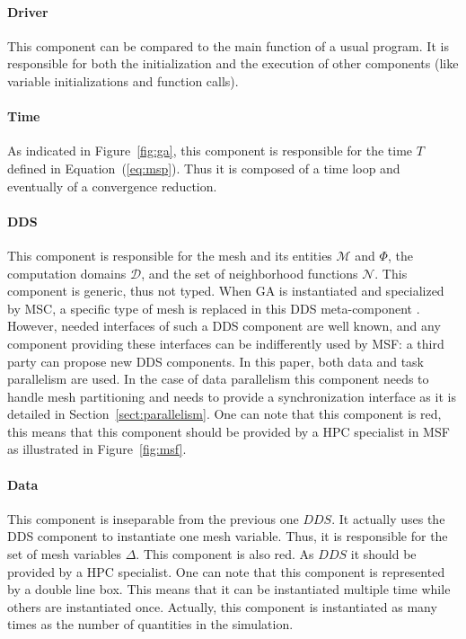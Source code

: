 \paragraph{\textbf{Driver}}
This component can be compared to the main function of a usual program. It is responsible for both the initialization and the execution of other components (like variable initializations and function calls).

\paragraph{\textbf{Time}}
As indicated in Figure~\ref{fig:ga}, this component is responsible for the time $T$ defined in Equation~(\ref{eq:msp}). Thus it is composed of a time loop and eventually of a convergence reduction.

\paragraph{\textbf{DDS}}
This component is responsible for the mesh and its entities $\mathcal{M}$ and $\Phi$, the computation domains $\mathcal{D}$, and the set of neighborhood functions $\mathcal{N}$. This component is generic, thus not typed. When GA is instantiated and specialized by MSC, a specific type of mesh is replaced in this DDS meta-component . However, needed interfaces of such a DDS component are well known, and any component providing these interfaces can be indifferently used by MSF: a third party can propose new DDS components. In this paper, both data and task parallelism are used. In the case of data parallelism this component needs to handle mesh partitioning and needs to provide a synchronization interface as it is detailed in Section~\ref{sect:parallelism}. One can note that this component is red, this means that this component should be provided by a HPC specialist in MSF as illustrated in Figure~\ref{fig:msf}.

\paragraph{\textbf{Data}}
This component is inseparable from the previous one $DDS$. It actually uses the DDS component to instantiate one mesh variable. Thus, it is responsible for the set of mesh variables $\Delta$. This component is also red. As $DDS$ it should be provided by a HPC specialist. One can note that this component is represented by a double line box. This means that it can be instantiated multiple time while others are instantiated once. Actually, this component is instantiated as many times as the number of quantities in the simulation.

